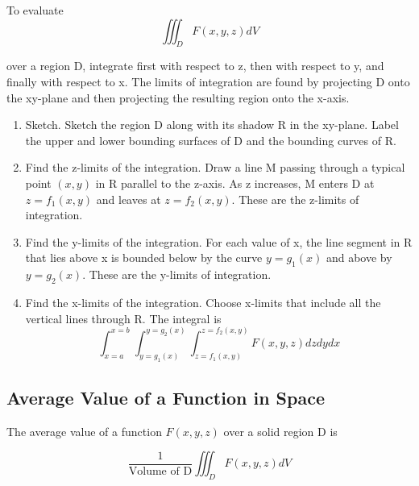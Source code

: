 \documentclass[12pt,a4paper,draft]{article}
\newenvironment{mynote}{\vspace{1\baselineskip}\begin{note}}{\end{note}\vspace{1\baselineskip}}
\begin{document}
To evaluate 
\[\iiint_D F(x,y,z) dV\]

over a region D, integrate first with respect to z, then with respect to y, and finally with respect to x. The limits of integration are found by projecting D onto the xy-plane and then projecting the resulting region onto the x-axis.

\begin{enumerate}
    \item Sketch. Sketch the region D along with its shadow R in the xy-plane. Label the upper and lower bounding surfaces of D and the bounding curves of R.
    \item Find the z-limits of the integration. Draw a line M passing through a typical point \((x,y)\) in R parallel to the z-axis. As z increases, M enters D at \(z = f_1(x,y)\) and leaves at \(z = f_2(x,y)\). These are the z-limits of integration.
    \item Find the y-limits of the integration. For each value of x, the line segment in R that lies above x is bounded below by the curve \(y = g_1(x)\) and above by \(y = g_2(x)\). These are the y-limits of integration.
    \item Find the x-limits of the integration. Choose x-limits that include all the vertical lines through R. The integral is \[ \int_{x=a}^{x=b}\int_{y=g_1(x)}^{y=g_2(x)}\int_{z = f_1(x,y)}^{z = f_2(x,y)} F(x,y,z) dz dy dx\]
\end{enumerate}

\subsection{Average Value of a Function in Space}

The average value of a function \(F(x,y,z)\) over a solid region D is

\begin{mynote}
    \[\frac{1}{\text{Volume of D}} \iiint_D F(x,y,z) dV\]
\end{mynote}
\end{document}
